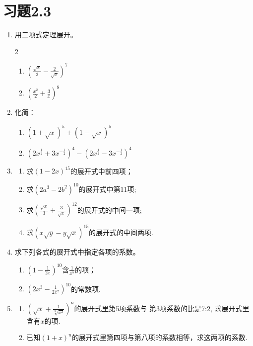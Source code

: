 \section*{习题2.3}
\begin{enumerate}
    \item 用二项式定理展开。
\begin{multicols}{2}
\begin{enumerate}[(1)]
    \item $\left( \frac {\sqrt {x}}2- \frac 2{\sqrt {x}}\right) ^{7}$
    \item $\left( \frac {x^{2}}2+ \frac {3}{x}\right) ^{8}$
\end{enumerate}    
\end{multicols}
\item 化简：
\begin{enumerate}[(1)]
    \item $(1+\sqrt{x})^{5}+(1-\sqrt{x})^{5}$
    \item $\left( 2x^{\tfrac 12}+ 3x^{- \tfrac 12}\right) ^{4}- \left( 2x^{\tfrac 12}- 3x^{- \tfrac 12}\right) ^{4}$
\end{enumerate}
\item \begin{enumerate}[(1)]
    \item 求$(1-2x)^{15}$的展开式中前四项；
    \item 求$(2a^{3}-2b^{2})^{10}$的展开式中第11项;
    \item 求$\left(\frac{\sqrt{x}}{3}+\frac{3}{\sqrt{x}}\right)^{12}$的展开式的中间一项;
\item 求$(x\sqrt{y}-y\sqrt{x})^{15}$的展开式的中间两项.
\end{enumerate}
\item 求下列各式的展开式中指定各项的系数。
\begin{enumerate}[(1)]
    \item $\left( 1- \frac 1{2x}\right)^{10}$含$\frac1{x^5}$的项；
    \item $\left(2x^{3}-\frac{1}{2x^{2}}\right)^{10}$的常数项.
\end{enumerate}
 
\item \begin{enumerate}[(1)]
    \item $\left({\sqrt {x}} + \frac 1{\sqrt [3]{x^{2}}}\right) ^{n}$的展开式里第5项系数与
第3项系数的比是7:2, 求展开式里含有$x$的项.
\item 已知$(1+x)^n$的展开式里第四项与第八项的系数相等，求这两项的系数.
\end{enumerate}


\end{enumerate}
